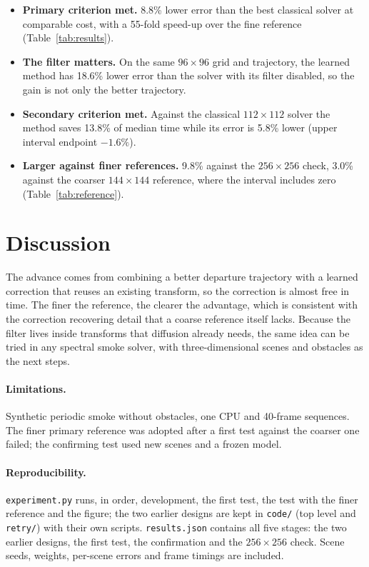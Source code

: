 \documentclass[11pt]{article}
\begin{document}
\begin{itemize}
\item \textbf{Primary criterion met.} 8.8\% lower error than the best classical solver at comparable cost, with a
55-fold speed-up over the fine reference (Table~\ref{tab:results}).
\item \textbf{The filter matters.} On the same $96\times96$ grid and trajectory, the learned method has 18.6\% lower
error than the solver with its filter disabled, so the gain is not only the better trajectory.
\item \textbf{Secondary criterion met.} Against the classical $112\times112$ solver the method saves 13.8\% of median
time while its error is 5.8\% lower (upper interval endpoint $-1.6\%$).
\item \textbf{Larger against finer references.} 9.8\% against the $256\times256$ check, 3.0\% against the coarser
$144\times144$ reference, where the interval includes zero (Table~\ref{tab:reference}).
\end{itemize}

\section{Discussion}
The advance comes from combining a better departure trajectory with a learned correction that reuses an existing
transform, so the correction is almost free in time. The finer the reference, the clearer the advantage, which is
consistent with the correction recovering detail that a coarse reference itself lacks. Because the filter lives
inside transforms that diffusion already needs, the same idea can be tried in any spectral smoke solver, with
three-dimensional scenes and obstacles as the next steps.

\paragraph{Limitations.} Synthetic periodic smoke without obstacles, one CPU and 40-frame sequences. The finer primary
reference was adopted after a first test against the coarser one failed; the confirming test used new scenes and a
frozen model.

\paragraph{Reproducibility.} \texttt{experiment.py} runs, in order, development, the first test, the test with the
finer reference and the figure; the two earlier designs are kept in \texttt{code/} (top level and
\texttt{retry/}) with their own scripts. \texttt{results.json} contains all five stages: the two earlier designs,
the first test, the confirmation and the $256\times256$ check. Scene seeds, weights, per-scene errors and frame
timings are included.
\end{document}
